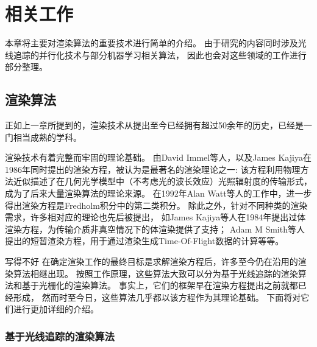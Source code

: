 \chapter{相关工作}
\label{cha:relatedwork}
本章将主要对渲染算法的重要技术进行简单的介绍。
由于研究的内容同时涉及光线追踪的并行化技术与部分机器学习相关算法，
因此也会对这些领域的工作进行部分整理。

\section{渲染算法}

正如上一章所提到的，渲染技术从提出至今已经拥有超过50余年的历史，已经是一门相当成熟的学科。


渲染技术有着完整而牢固的理论基础。
由David Immel等人\cite{RenderingEquation1}，以及James Kajiya\cite{RenderingEquation2}在1986年同时提出的渲染方程，被认为是最著名的渲染理论之一:
该方程利用物理方法近似描述了在几何光学模型中（不考虑光的波长效应）光照辐射度的传输形式，成为了后来大量渲染算法的理论来源。
在1992年Alan Watt等人的工作\cite{Fredholm}中，进一步得出渲染方程是Fredholm积分中的第二类积分。
除此之外，针对不同种类的渲染需求，许多相对应的理论也先后被提出，
如James Kajiya等人在1984年提出过体渲染方程\cite{VolumnRenderingEquation}，为传输介质非真空情况下的体渲染提供了支持；
Adam M Smith等人提出的短暂渲染方程\cite{TransientEquation}，用于通过渲染生成Time-Of-Flight数据的计算等等。


写得不好{
    在确定渲染工作的最终目标是求解渲染方程后，许多至今仍在沿用的渲染算法相继出现。
    按照工作原理，这些算法大致可以分为基于光线追踪的渲染算法和基于光栅化的渲染算法。   
    事实上，它们的框架早在渲染方程提出之前就都已经形成，
    然而时至今日，这些算法几乎都以该方程作为其理论基础。
}
下面将对它们进行更加详细的介绍。

\subsection{基于光线追踪的渲染算法}

